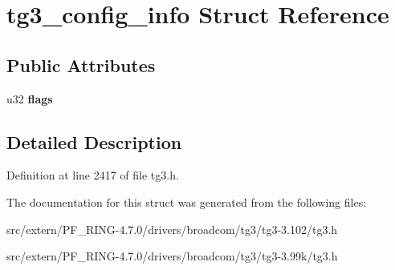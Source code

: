 \hypertarget{structtg3__config__info}{
\section{tg3\_\-config\_\-info Struct Reference}
\label{structtg3__config__info}
}
\subsection*{Public Attributes}
\begin{DoxyCompactItemize}
\item 
\hypertarget{structtg3__config__info_a699a791816f02ab81d592be93aa3accd}{
u32 {\bfseries flags}}
\label{structtg3__config__info_a699a791816f02ab81d592be93aa3accd}

\end{DoxyCompactItemize}


\subsection{Detailed Description}


Definition at line 2417 of file tg3.h.



The documentation for this struct was generated from the following files:\begin{DoxyCompactItemize}
\item 
src/extern/PF\_\-RING-\/4.7.0/drivers/broadcom/tg3/tg3-\/3.102/tg3.h\item 
src/extern/PF\_\-RING-\/4.7.0/drivers/broadcom/tg3/tg3-\/3.99k/tg3.h\end{DoxyCompactItemize}
